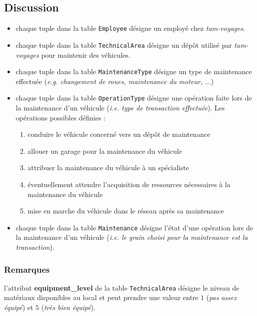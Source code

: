 \documentclass[a4paper,12pt]{report}
\begin{document}
\subsection{Discussion}
\begin{itemize}
  \item chaque tuple dans la table \texttt{Employee} désigne un employé chez \textit{tam-voyages}.
  \item chaque tuple dans la table \texttt{TechnicalArea} désigne un dépôt utilisé par \textit{tam-voyages} pour maintenir des véhicules.
  \item chaque tuple dans la table \texttt{MaintenanceType} désigne un type de maintenance effectuée (\textit{e.g. changement de roues, maintenance du moteur, $\dots$})
  \item chaque tuple dans la table \texttt{OperationType} désigne une opération faite lors de la maintenance d'un véhicule (\textit{i.e. type de transaction effectuée}). Les opérations possibles définies :
  \begin{enumerate}
    \item conduire le véhicule concerné vers un dépôt de maintenance
    \item allouer un garage pour la maintenance du véhicule
    \item attribuer la maintenance du véhicule à un spécialiste
    \item éventuellement attendre l'acquisition de ressources nécessaires à la maintenance du véhicule
    \item mise en marche du véhicule dans le réseau après sa maintenance
  \end{enumerate}
  \item chaque tuple dans la table \texttt{Maintenance} désigne l'état d'une opération lors de la maintenance d'un véhicule (\textit{i.e. le grain choisi pour la maintenance est la transaction}).
\end{itemize}

\subsubsection{Remarques}
l'attribut \textbf{equipment\_level} de la table \texttt{TechnicalArea} désigne le niveau de matériaux disponibles au local et peut prendre une valeur entre $1$ (\textit{pas assez équipé}) et $5$ (\textit{très bien équipé}).
\end{document}
